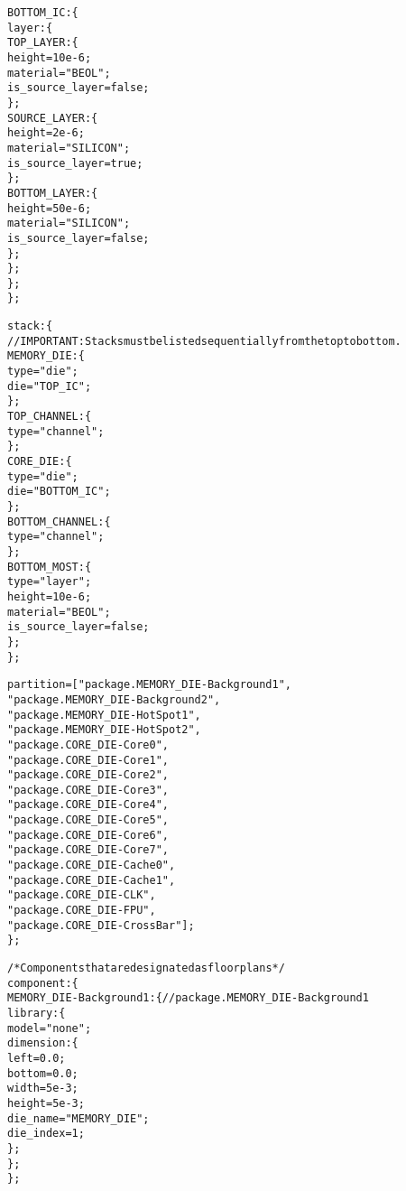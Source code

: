 {\begin{alltt}
                BOTTOM_IC: \{
                    layer: \{
                        TOP_LAYER: \{
                            height = 10e-6;
                            material = "BEOL";
                            is_source_layer = false;
                        \};
                        SOURCE_LAYER: \{
                            height = 2e-6;
                            material = "SILICON";
                            is_source_layer = true;
                        \};
                        BOTTOM_LAYER: \{
                            height = 50e-6;
                            material = "SILICON";
                            is_source_layer = false;
                        \};
                    \};
               \};
            \};
            
            stack: \{
                // IMPORTANT: Stacks must be listed sequentially from the top to bottom.
                MEMORY_DIE: \{
                    type = "die";
                    die = "TOP_IC";
                \};
                TOP_CHANNEL: \{
                    type = "channel";
                \};
                CORE_DIE: \{
                    type = "die";
                    die = "BOTTOM_IC";
                \};
                BOTTOM_CHANNEL: \{
                    type = "channel";
                \};
                BOTTOM_MOST: \{
                    type = "layer";
                    height = 10e-6;
                    material = "BEOL";
                    is_source_layer = false;
                \};
            \};
            
            partition = ["package.MEMORY_DIE-Background1",
                         "package.MEMORY_DIE-Background2",
                         "package.MEMORY_DIE-HotSpot1",
                         "package.MEMORY_DIE-HotSpot2",
                         "package.CORE_DIE-Core0",
                         "package.CORE_DIE-Core1",
                         "package.CORE_DIE-Core2",
                         "package.CORE_DIE-Core3",
                         "package.CORE_DIE-Core4",
                         "package.CORE_DIE-Core5",
                         "package.CORE_DIE-Core6",
                         "package.CORE_DIE-Core7",
                         "package.CORE_DIE-Cache0",
                         "package.CORE_DIE-Cache1",
                         "package.CORE_DIE-CLK",
                         "package.CORE_DIE-FPU",
                         "package.CORE_DIE-CrossBar"];
        \};
        
        /* Components that are designated as floorplans */
        component: \{
            MEMORY\_DIE-Background1: \{ // package.MEMORY\_DIE-Background1
                library: \{
                    model = "none";
                    dimension: \{
                        left = 0.0;
                        bottom = 0.0;
                        width = 5e-3;
                        height = 5e-3;
                        die_name = "MEMORY_DIE";
                        die_index = 1;
                    \};
                \};
            \};
            

\end{alltt}}
